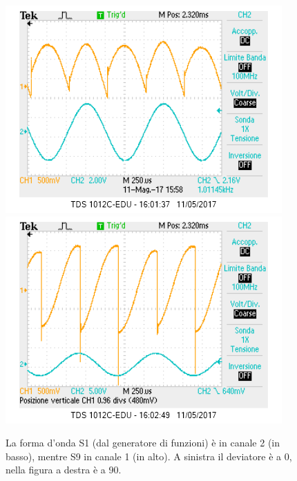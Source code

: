 \documentclass[10pt,a4paper]{article}
\begin{document}
\begin{figure}[!htb]
  \centering
  \includegraphics[scale=0.45]{dev0ch1S9-ch2S1.png}\includegraphics[scale=0.45]{dev90ch1S9-ch2S1.png}
\caption{La forma d'onda S1 (dal generatore di funzioni) è in canale 2 (in basso), mentre S9 in canale 1 (in alto). A sinistra il deviatore è a 0\degree, nella figura a destra è a 90\degree. \label{osc:devS9}}
\end{figure}
\end{document}
